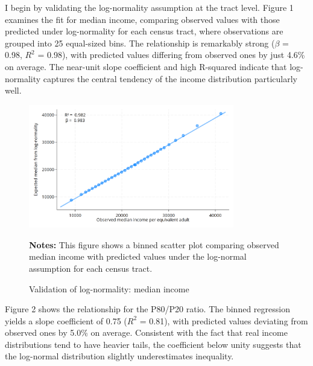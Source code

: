 
I begin by validating the log-normality assumption at the tract level. Figure 1 examines the fit for median income, comparing observed values with those predicted under log-normality for each census tract, where observations are grouped into 25 equal-sized bins. The relationship is remarkably strong ($\beta$ = 0.98, $R^2$ = 0.98), with predicted values differing from observed ones by just 4.6\% on average. The near-unit slope coefficient and high R-squared indicate that log-normality captures the central tendency of the income distribution particularly well.

\begin{figure}[H]
\begin{center}
\captionsetup{justification=centering}
\caption{Validation of log-normality: median income}
\label{fig:median}
\includegraphics[width=0.8\textwidth]{output/binned_scatter_median.png}
\end{center}
\begin{fignotes2}
\textbf{Notes:} This figure shows a binned scatter plot comparing observed median income with predicted values under the log-normal assumption for each census tract. 
\end{fignotes2}
\end{figure}

Figure 2 shows the relationship for the P80/P20 ratio. The binned regression yields a slope coefficient of 0.75 ($R^2$ = 0.81), with predicted values deviating from observed ones by 5.0\% on average. Consistent with the fact that real income distributions tend to have heavier tails, the coefficient below unity suggests that the log-normal distribution slightly underestimates inequality.

